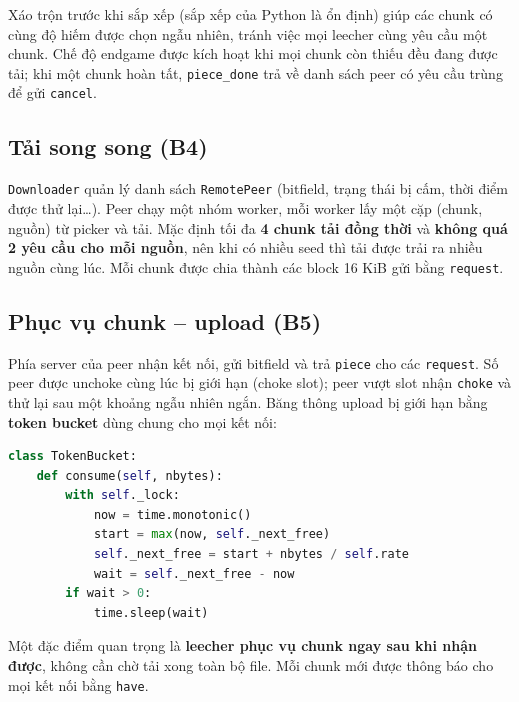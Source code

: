 \documentclass[12pt,a4paper,oneside]{report}
\begin{document}
Xáo trộn trước khi sắp xếp (sắp xếp của Python là ổn định) giúp các chunk có cùng độ hiếm được chọn ngẫu nhiên, tránh việc mọi leecher cùng yêu cầu một chunk. Chế độ endgame được kích hoạt khi mọi chunk còn thiếu đều đang được tải; khi một chunk hoàn tất, \texttt{piece\_done} trả về danh sách peer có yêu cầu trùng để gửi \texttt{cancel}.

\subsection{Tải song song (B4)}
\texttt{Downloader} quản lý danh sách \texttt{RemotePeer} (bitfield, trạng thái bị cấm, thời điểm được thử lại\dots). Peer chạy một nhóm worker, mỗi worker lấy một cặp (chunk, nguồn) từ picker và tải. Mặc định tối đa \textbf{4 chunk tải đồng thời} và \textbf{không quá 2 yêu cầu cho mỗi nguồn}, nên khi có nhiều seed thì tải được trải ra nhiều nguồn cùng lúc. Mỗi chunk được chia thành các block 16 KiB gửi bằng \texttt{request}.

\subsection{Phục vụ chunk -- upload (B5)}
Phía server của peer nhận kết nối, gửi bitfield và trả \texttt{piece} cho các \texttt{request}. Số peer được unchoke cùng lúc bị giới hạn (choke slot); peer vượt slot nhận \texttt{choke} và thử lại sau một khoảng ngẫu nhiên ngắn. Băng thông upload bị giới hạn bằng \textbf{token bucket} dùng chung cho mọi kết nối:

\begin{lstlisting}[language=Python]
class TokenBucket:
    def consume(self, nbytes):
        with self._lock:
            now = time.monotonic()
            start = max(now, self._next_free)
            self._next_free = start + nbytes / self.rate
            wait = self._next_free - now
        if wait > 0:
            time.sleep(wait)
\end{lstlisting}

Một đặc điểm quan trọng là \textbf{leecher phục vụ chunk ngay sau khi nhận được}, không cần chờ tải xong toàn bộ file. Mỗi chunk mới được thông báo cho mọi kết nối bằng \texttt{have}.
\end{document}
